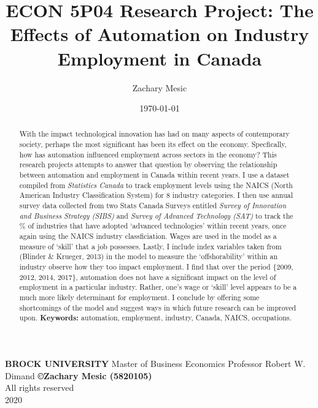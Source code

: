 \documentclass[12pt]{article}
\begin{document}
\title{\textbf{ECON 5P04 Research Project: The Effects of Automation on Industry Employment in Canada}}
\author{Zachary Mesic}
\date{\today}
\maketitle

\thispagestyle{empty}
\vfill
\begin{center}
\textbf{BROCK UNIVERSITY}
\break
Master of Business  Economics
\break
Professor Robert W. Dimand
\linebreak
\linebreak
\textbf{\copyright{Zachary Mesic (5820105)}}\\
All rights reserved\\

2020
\end{center}

\newpage

\begin{abstract}
\begin{flushleft}
With the impact technological innovation has had on many aspects of contemporary society, perhaps the most significant has been its effect on the economy. Specfically, how has automation influenced employment across sectors in the economy? This research projects attempts to answer that question by observing the relationship between automation and employment in Canada within recent years. I use a dataset compiled from \textit{Statistics Canada} to track employment levels using the NAICS (North American Industry Classification System) for 8 industry categories. I then use annual survey data collected from two Stats Canada Surveys entitled \textit{Survey of Innovation and Business Strategy (SIBS)} and \textit{Survey of Advanced Technology (SAT)} to track the \% of industries that have adopted `advanced technologies' within recent years, once again using the NAICS industry classficiation. Wages are used in the model as a measure of `skill' that a job possesses. Lastly, I include index variables taken from (Blinder \& Krueger, 2013) in the model to measure the `offshorability' within an industry observe how they too impact employment. I find that over the period \{2009, 2012, 2014, 2017\}, automation does not have a significant impact on the level of employment in a particular industry. Rather, one's wage or `skill' level appears to be a much more likely determinant for employment. I conclude by offering some shortcomings of the model and suggest ways in which future research can be improved upon.
\break
\linebreak
\textbf{Keywords:} automation, employment, industry, Canada, NAICS, occupations.
\end{flushleft}
\end{abstract}
\end{document}
